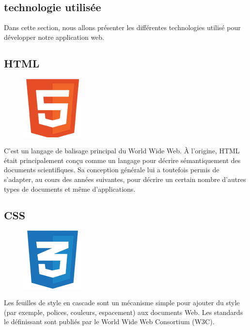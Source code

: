         

    \subsection{technologie utilisée}
Dans cette section, nous allons présenter les différentes technologies  utilisé pour développer notre application web.
    
    \subsection{HTML}
            \begin{figure}
                \vspace{-22pt}
              \begin{center}
                 \includegraphics[scale=0.36]{images/logo/html.png}
                 \label{fig70}
              \end{center}
              \vspace{-20pt}
              \vspace{-10pt}
            \end{figure}
        C'est un langage de balisage principal du World Wide Web. À l'origine, HTML était principalement conçu comme un langage pour décrire sémantiquement des documents scientifiques. Sa conception générale lui a toutefois permis de s’adapter, au cours des années suivantes, pour décrire un certain nombre d’autres types de documents et même d’applications\cite{14}.
    
    \subsection{CSS}
            \begin{figure}
                \vspace{-22pt}
              \begin{center}
                 \includegraphics[scale=0.36]{images/logo/css.png}
                 \label{fig71}
              \end{center}
              \vspace{-20pt}
              \vspace{-10pt}
            \end{figure}
        Les feuilles de style en cascade sont un mécanisme simple pour ajouter du style (par exemple, polices, couleurs, espacement) aux documents Web. Les standards le définissant sont publiés par le World Wide Web Consortium (W3C)\cite{15}.
    
